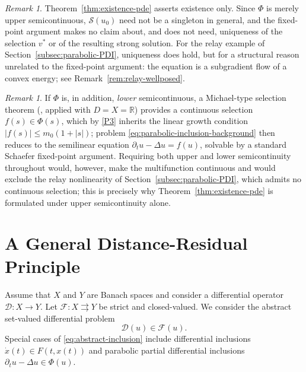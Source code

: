 \documentclass[11pt]{elsarticle}
\theoremstyle{definition}
\theoremstyle{remark}
\newtheorem{remark}[theorem]{Remark}
\numberwithin{equation}{section}
\begin{document}
\begin{remark}
	Theorem~\ref{thm:existence-pde} asserts existence only. Since $\Phi$
	is merely upper semicontinuous, $\mathcal{S}(u_0)$ need not be a
	singleton in general, and the fixed-point argument makes no claim
	about, and does not need, uniqueness of the selection $v^\ast$ or of
	the resulting strong solution. For the relay example of
	Section~\ref{subsec:parabolic-PDI}, uniqueness does hold, but for a
	structural reason unrelated to the fixed-point argument: the
	equation is a subgradient flow of a convex energy; see
	Remark~\ref{rem:relay-wellposed}.
\end{remark}

\begin{remark}
	If $\Phi$ is, in addition, \emph{lower} semicontinuous, a
	Michael-type selection theorem (\cite[Lemma~2.1]{deimling_1992},
	applied with $D=X=\mathbb{R}$) provides a continuous selection
	$f(s)\in\Phi(s)$, which by \ref{P3} inherits the linear growth
	condition $|f(s)|\le m_0(1+|s|)$; problem
	\eqref{eq:parabolic-inclusion-background} then reduces to the
	semilinear equation $\partial_t u-\Delta u=f(u)$, solvable by a
	standard Schaefer fixed-point argument. Requiring both upper and
	lower semicontinuity throughout would, however, make the
	multifunction continuous and would exclude the relay nonlinearity of
	Section~\ref{subsec:parabolic-PDI}, which admits no continuous
	selection; this is precisely why Theorem~\ref{thm:existence-pde} is
	formulated under upper semicontinuity alone.
\end{remark}

	\section{A General Distance-Residual Principle}
	\label{sec:principle}
	
	Assume that $X$ and $Y$ are Banach spaces and consider a differential operator $\mathcal{D}:X\to Y$. Let $\mathcal{F}:X\rightrightarrows Y$ be strict and closed-valued. We consider the abstract
	set-valued differential problem
	\begin{equation}\label{eq:abstract-inclusion}
		\mathcal{D}(u)\in\mathcal{F}(u).
	\end{equation}
	Special cases of \eqref{eq:abstract-inclusion} include differential
	inclusions $\dot{x}(t)\in F(t,x(t))$ and parabolic partial differential
	inclusions $\partial_t u-\Delta u\in\Phi(u)$.
	
\end{document}
